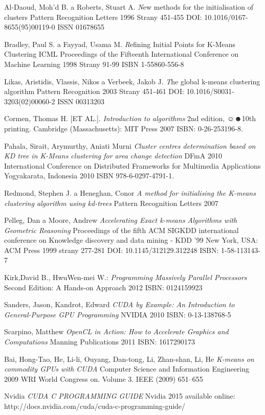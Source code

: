 \begin{thebibliography}{99}
{\sc Al-Daoud}, Moh'd B. a {\sc Roberts}, Stuart A.
{\emph New methods for the initialisation of clusters}
Pattern Recognition Letters
1996
Strany 451-455
DOI: 10.1016/0167-8655(95)00119-0
ISSN 01678655

{\sc Bradley}, Paul S. a {\sc Fayyad}, Usama M.
{\emph Refining Initial Points for K-Means Clustering}
ICML Proceedings of the Fifteenth International Conference on Machine Learning
1998
Strany 91-99
ISBN 1-55860-556-8

{\sc Likas}, Aristidis, {\sc Vlassis}, Nikos a {\sc Verbeek}, Jakob J.
{\emph The global k-means clustering algorithm}
Pattern Recognition
2003
Strany 451-461
DOI: 10.1016/S0031-3203(02)00060-2
ISSN 00313203

{\sc Cormen,} Thomas H. [ET AL.].
\emph{Introduction to algorithms}
2nd edition, ☺☻10th printing.
Cambridge (Massachusetts): MIT Press
2007 
ISBN: 0-26-253196-8.

{\sc Pahala,} Sirait, {\sc Arymurthy,} Aniati Murni
\emph{Cluster centres determination based on KD tree in K-Means clustering for area change detection}
DFmA 2010 International Conference on Distributed Frameworks for Multimedia Applications
Yogyakarata, Indonesia
2010 
ISBN 978-6-0297-4791-1.

{\sc Redmond}, Stephen J. a {\sc Heneghan}, Conor
\emph{A method for initialising the K-means clustering algorithm using kd-trees}
Pattern Recognition Letters
2007

{\sc Pelleg}, Dan a {\sc Moore}, Andrew
\emph{Accelerating Exact k-means Algorithms with Geometric Reasoning}
Proceedings of the fifth ACM SIGKDD international conference on Knowledge discovery and data mining - KDD '99 
New York, USA: ACM Press
1999
strany 277-281
DOI: 10.1145/312129.312248
ISBN: 1-58-113143-7

{\sc Kirk,}David B., {\sc Hwu}Wen-mei W.:
\emph{Programming Massively Parallel Processors}
Second Edition: A Hands-on Approach
2012
ISBN: 0124159923 

{\sc Sanders,} Jason, {\sc Kandrot,} Edward
\emph{CUDA by Example: An Introduction to General-Purpose GPU Programming}
NVIDIA
2010
ISBN: 0-13-138768-5 

{\sc Scarpino,} Matthew
\emph{OpenCL in Action: How to Accelerate Graphics and Computations}
Manning Publications
2011
ISBN: 1617290173 

{\sc Bai,} Hong-Tao, {\sc He,} Li-li, {\sc Ouyang,} Dan-tong, {\sc Li,} Zhan-shan, {\sc Li, } He
\emph{K-means on commodity GPUs with CUDA}
Computer Science and Information Engineering
2009
WRI World Congress on. Volume 3.
IEEE (2009) 651–655 

Nvidia
\emph{CUDA C PROGRAMMING GUIDE}
Nvidia
2015
available online: http://docs.nvidia.com/cuda/cuda-c-programming-guide/
\end{thebibliography}